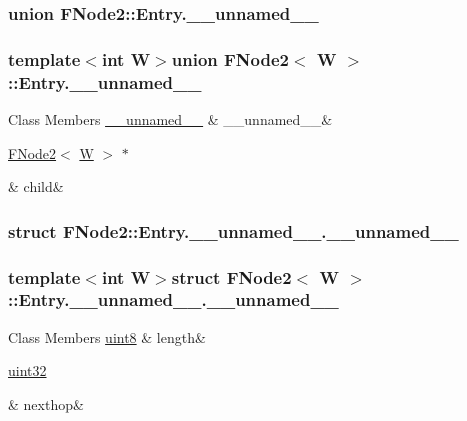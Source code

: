 \subsubsection{union F\-Node2\-:\-:Entry.\-\_\-\-\_\-unnamed\-\_\-\-\_\-}
\subsubsection*{template$<$int W$>$union F\-Node2$<$ W $>$\-::\-Entry.\-\_\-\-\_\-unnamed\-\_\-\-\_\-}

\begin{DoxyFields}{Class Members}
\hypertarget{structFNode2_a1378d7d8767899287b0407055215aa4e}{\hyperlink{structFNode2_structFNode2_1_1Entry_8____unnamed_____8____unnamed____}{\-\_\-\-\_\-unnamed\-\_\-\-\_\-}}\label{structFNode2_a1378d7d8767899287b0407055215aa4e}
&
\-\_\-\-\_\-unnamed\-\_\-\-\_\-&
\\
\hline

\hypertarget{structFNode2_a1b7d5726533ab525a8760351e9b5e415}{\hyperlink{structFNode2}{F\-Node2}$<$ \hyperlink{test__u128_8cpp_ab21b528bc38899d04d3a7053e52fb797}{W} $>$ $\ast$}\label{structFNode2_a1b7d5726533ab525a8760351e9b5e415}
&
child&
\\
\hline

\end{DoxyFields}
\label{structFNode2_1_1Entry_8____unnamed_____8____unnamed____}
\hypertarget{structFNode2_structFNode2_1_1Entry_8____unnamed_____8____unnamed____}{}
\subsubsection{struct F\-Node2\-:\-:Entry.\-\_\-\-\_\-unnamed\-\_\-\-\_\-.\-\_\-\-\_\-unnamed\-\_\-\-\_\-}
\subsubsection*{template$<$int W$>$struct F\-Node2$<$ W $>$\-::\-Entry.\-\_\-\-\_\-unnamed\-\_\-\-\_\-.\-\_\-\-\_\-unnamed\-\_\-\-\_\-}

\begin{DoxyFields}{Class Members}
\hypertarget{structFNode2_a2fa47f7c65fec19cc163b195725e3844}{\hyperlink{types_8h_a34ecedcf03a70dc91e4616212d79267d}{uint8}}\label{structFNode2_a2fa47f7c65fec19cc163b195725e3844}
&
length&
\\
\hline

\hypertarget{structFNode2_acd89a5ed2bdc1b5e6183409f0c056ee2}{\hyperlink{types_8h_abd01e8e67e3d94cab04ecaaf4f85ac1b}{uint32}}\label{structFNode2_acd89a5ed2bdc1b5e6183409f0c056ee2}
&
nexthop&
\\
\hline

\end{DoxyFields}
\label{structFNode2_1_1Entry_8____unnamed_____8____unnamed____}
\hypertarget{structFNode2_structFNode2_1_1Entry_8____unnamed_____8____unnamed____}{}

